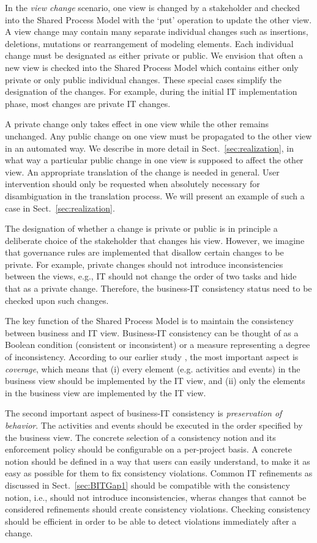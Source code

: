 In the \emph{view change} scenario, one view is changed by a stakeholder and checked into the Shared Process Model with the `put' operation to update the other view. A view change may contain many separate individual changes such as insertions, deletions, mutations or rearrangement of modeling elements. Each individual change must be designated as either private or public. We envision that often a new view is checked into the Shared Process Model which contains either only private or only public individual changes.  These special cases simplify the designation of the changes.  For example, during the initial IT implementation phase, most changes are private IT changes.  

A private change only takes effect in one view while the other remains unchanged. Any public change on one view must be propagated to the other view in an automated way. We describe in more detail in Sect.~\ref{sec:realization}, in what way a particular public change in one view is supposed to affect the other view. An appropriate translation of the change is  needed in general. User intervention should only be requested when absolutely necessary for disambiguation in the translation process. We will present an example of such a case in Sect.~\ref{sec:realization}.

The designation of whether a change is private or public is in principle a deliberate choice of the stakeholder that changes his view. However, we imagine that governance rules are implemented that disallow certain changes to be private. For example, private changes should not introduce inconsistencies between the views, e.g., IT should not change the order of two tasks and hide that as a private change. Therefore, the business-IT consistency status need to be checked upon such changes.

The key function of the Shared Process Model is to maintain the consistency between business and IT view. Business-IT consistency can be thought of as a Boolean condition (consistent or inconsistent) or a measure representing a degree of inconsistency. According to our earlier study \cite{BXC+12}, the most important aspect is \emph{coverage}, which means that (i) every element (e.g. activities and events) in the business view should be implemented by the IT view, and (ii) only the elements in the business view are implemented by the IT view.

The second important aspect of business-IT consistency is \emph{preservation of behavior}. The activities and events should be executed in the order specified by the business view. The concrete selection of a consistency notion and its enforcement policy should be configurable on a per-project basis. A concrete notion should be defined in a way that users can easily understand, to make it as easy as possible for them to fix consistency violations. Common IT refinements as discussed in Sect.~\ref{sec:BITGap1} should be compatible with the consistency notion, i.e., should not introduce inconsistencies, wheras changes that cannot be considered refinements should create consistency violations. Checking consistency should be efficient in order to be able to detect violations immediately after a change.


